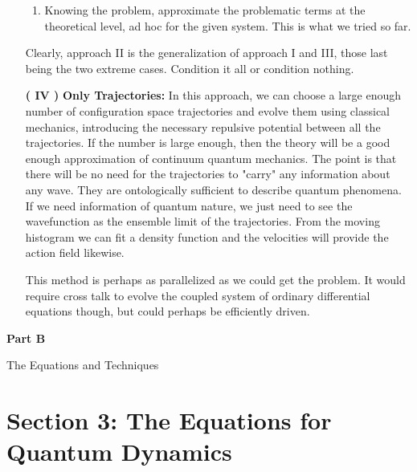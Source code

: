 \documentclass[11pt, a4paper]{article} %
\newenvironment{kapituloBerria}[1][]
  {\clearpage           %
   \thispagestyle{empty}%
   \vspace*{\stretch{2}}%
   \raggedleft          %
   {\textbf{{\fontsize{60}{40}\selectfont \hspace{+9.5cm}#1\newline \newline}}}
   \bf
   \fontsize{30}{20}\selectfont
  }
  {\par %
   \vspace{\stretch{3}} %
   \clearpage           %
  }
\begin{document}
\begin{enumerate}
\begin{enumerate}
\item Knowing the problem, approximate the problematic terms at the theoretical level, ad hoc for the given system. This is what we tried so far.
\end{enumerate}

Clearly, approach II is the generalization of approach I and III, those last being the two extreme cases. Condition it all or condition nothing.

\item [\bf ( IV )] {\bf Only Trajectories:} In this approach, we can choose a large enough number of configuration space trajectories and evolve them using classical mechanics, introducing the necessary repulsive potential between all the trajectories. If the number is large enough, then the theory will be a good enough approximation of continuum quantum mechanics. The point is that there will be no need for the trajectories to "carry" any information about any wave. They are ontologically sufficient to describe quantum phenomena. If we need information of quantum nature, we just need to see the wavefunction as the ensemble limit of the trajectories. From the moving histogram we can fit a density function and the velocities will provide the action field likewise.

This method is perhaps as parallelized as we could get the problem. It would require cross talk to evolve the coupled system of ordinary differential equations though, but could perhaps be efficiently driven.

\end{enumerate}


\newpage

\begin{kapituloBerria}[Part B]
The Equations and Techniques
\end{kapituloBerria}

\section*{Section 3: The Equations for Quantum Dynamics }
\end{document}
